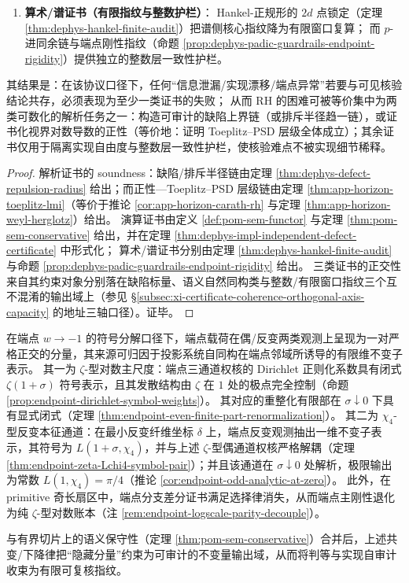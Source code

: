 \begin{theorem}
\begin{enumerate}
  \item \textbf{算术/谱证书（有限指纹与整数护栏）}：
  Hankel-正规形的 \(2d\) 点锁定（定理 \ref{thm:dephys-hankel-finite-audit}）把谱侧核心指纹降为有限窗口复算；
  而 \(p\)-进同余链与端点刚性指纹（命题 \ref{prop:dephys-padic-guardrails-endpoint-rigidity}）提供独立的整数层一致性护栏。
\end{enumerate}
其结果是：在该协议口径下，任何“信息泄漏/实现漂移/端点异常”若要与可见核验结论共存，必须表现为至少一类证书的失败；
从而 RH 的困难可被等价集中为两类可数化的解析任务之一：构造可审计的缺陷上界链（或排斥半径趋一链），或证书化视界对数导数的正性（等价地：证明 Toeplitz--PSD 层级全体成立）；其余证书仅用于隔离实现自由度与整数层一致性护栏，使核验难点不被实现细节稀释。
\end{theorem}

\begin{proof}
解析证书的 soundness：缺陷/排斥半径链由定理 \ref{thm:dephys-defect-repulsion-radius} 给出；而正性—Toeplitz--PSD 层级链由定理 \ref{thm:app-horizon-toeplitz-lmi}（等价于推论 \ref{cor:app-horizon-carath-rh} 与定理 \ref{thm:app-horizon-weyl-herglotz}）给出。
演算证书由定义 \ref{def:pom-sem-functor} 与定理 \ref{thm:pom-sem-conservative} 给出，并在定理 \ref{thm:dephys-impl-independent-defect-certificate} 中形式化；
算术/谱证书分别由定理 \ref{thm:dephys-hankel-finite-audit} 与命题 \ref{prop:dephys-padic-guardrails-endpoint-rigidity} 给出。
三类证书的正交性来自其约束对象分别落在缺陷标量、语义自然同构类与整数/有限窗口指纹三个互不混淆的输出域上（参见 \S\ref{subsec:xi-certificate-coherence-orthogonal-axis-capacity} 的地址三轴口径）。证毕。
\end{proof}

\begin{remark}\label{rem:endpoint-obstruction-dichotomy}
在端点 \(w\to-1\) 的符号分解口径下，端点载荷在偶/反变两类观测上呈现为一对严格正交的分量，其来源可归因于投影系统自同构在端点邻域所诱导的有限维不变子表示。
其一为 \(\zeta\)-型对数主尺度：端点三通道权核的 Dirichlet 正则化系数具有闭式 \(\zeta(1+\sigma)\) 符号表示，且其发散结构由 \(\zeta\) 在 \(1\) 处的极点完全控制（命题 \ref{prop:endpoint-dirichlet-symbol-weights}）。
其对应的重整化有限部在 \(\sigma\downarrow 0\) 下具有显式闭式（定理 \ref{thm:endpoint-even-finite-part-renormalization}）。
其二为 \(\chi_4\)-型反变本征通道：在最小反变纤维坐标 \(\delta\) 上，端点反变观测抽出一维不变子表示，其符号为 \(L(1+\sigma,\chi_4)\)，并与上述 \(\zeta\)-型偶通道权核严格解耦（定理 \ref{thm:endpoint-zeta-Lchi4-symbol-pair}）；并且该通道在 \(\sigma\downarrow 0\) 处解析，极限输出为常数 \(L(1,\chi_4)=\pi/4\)（推论 \ref{cor:endpoint-odd-analytic-at-zero}）。
此外，在 primitive 奇长扇区中，端点分支差分证书满足选择律消失，从而端点主刚性退化为纯 \(\zeta\)-型对数账本（注 \ref{rem:endpoint-logscale-parity-decouple}）。
\end{remark}
与有界切片上的语义保守性（定理 \ref{thm:pom-sem-conservative}）合并后，上述共变/下降律把“隐藏分量”约束为可审计的不变量输出域，从而将判等与实现自审计收束为有限可复核指纹。

